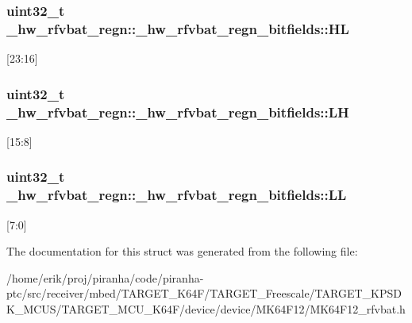 \subsubsection[{\texorpdfstring{HL}{HL}}]{\setlength{\rightskip}{0pt plus 5cm}uint32\+\_\+t \+\_\+hw\+\_\+rfvbat\+\_\+regn\+::\+\_\+hw\+\_\+rfvbat\+\_\+regn\+\_\+bitfields\+::\+HL}\hypertarget{struct__hw__rfvbat__regn_1_1__hw__rfvbat__regn__bitfields_a3d9aeeb7dd08466eca30ade9019accff}{}\label{struct__hw__rfvbat__regn_1_1__hw__rfvbat__regn__bitfields_a3d9aeeb7dd08466eca30ade9019accff}
\mbox{[}23\+:16\mbox{]} 
\subsubsection[{\texorpdfstring{LH}{LH}}]{\setlength{\rightskip}{0pt plus 5cm}uint32\+\_\+t \+\_\+hw\+\_\+rfvbat\+\_\+regn\+::\+\_\+hw\+\_\+rfvbat\+\_\+regn\+\_\+bitfields\+::\+LH}\hypertarget{struct__hw__rfvbat__regn_1_1__hw__rfvbat__regn__bitfields_ae39cb9b6d069568c933467fa858f9fcf}{}\label{struct__hw__rfvbat__regn_1_1__hw__rfvbat__regn__bitfields_ae39cb9b6d069568c933467fa858f9fcf}
\mbox{[}15\+:8\mbox{]} 
\subsubsection[{\texorpdfstring{LL}{LL}}]{\setlength{\rightskip}{0pt plus 5cm}uint32\+\_\+t \+\_\+hw\+\_\+rfvbat\+\_\+regn\+::\+\_\+hw\+\_\+rfvbat\+\_\+regn\+\_\+bitfields\+::\+LL}\hypertarget{struct__hw__rfvbat__regn_1_1__hw__rfvbat__regn__bitfields_a163a34db2c48e121720e5a72a2774b07}{}\label{struct__hw__rfvbat__regn_1_1__hw__rfvbat__regn__bitfields_a163a34db2c48e121720e5a72a2774b07}
\mbox{[}7\+:0\mbox{]} 

The documentation for this struct was generated from the following file\+:\begin{DoxyCompactItemize}
\item 
/home/erik/proj/piranha/code/piranha-\/ptc/src/receiver/mbed/\+T\+A\+R\+G\+E\+T\+\_\+\+K64\+F/\+T\+A\+R\+G\+E\+T\+\_\+\+Freescale/\+T\+A\+R\+G\+E\+T\+\_\+\+K\+P\+S\+D\+K\+\_\+\+M\+C\+U\+S/\+T\+A\+R\+G\+E\+T\+\_\+\+M\+C\+U\+\_\+\+K64\+F/device/device/\+M\+K64\+F12/M\+K64\+F12\+\_\+rfvbat.\+h\end{DoxyCompactItemize}
